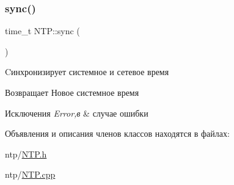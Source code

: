 \subsubsection{\texorpdfstring{sync()}{sync()}}
{\footnotesize\ttfamily time\+\_\+t N\+T\+P\+::sync (\begin{DoxyParamCaption}{ }\end{DoxyParamCaption})}



Cинхронизирует системное и сетевое время 

\begin{DoxyReturn}{Возвращает}
Новое системное время 
\end{DoxyReturn}

\begin{DoxyExceptions}{Исключения}
{\em Error,в} & случае ошибки \\
\hline
\end{DoxyExceptions}


Объявления и описания членов классов находятся в файлах\+:\begin{DoxyCompactItemize}
\item 
ntp/\mbox{\hyperlink{NTP_8h}{N\+T\+P.\+h}}\item 
ntp/\mbox{\hyperlink{NTP_8cpp}{N\+T\+P.\+cpp}}\end{DoxyCompactItemize}
